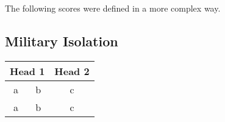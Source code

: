 The following scores were defined in a more complex way.

\subsection{Military Isolation}


\begin{tabular}{|c|c|c|}
  \hline
   \multicolumn{2}{|c|}{Head 1} & Head 2 \\
  \hline
   a & b & c \\
  \hline
   a & b & c \\
  \hline
\end{tabular}
 
